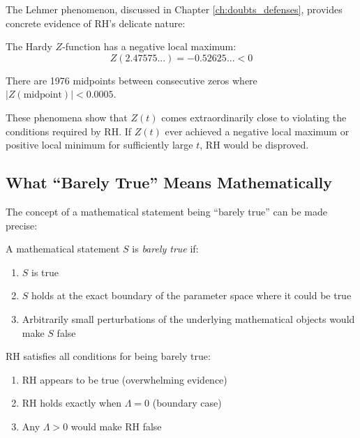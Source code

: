 The Lehmer phenomenon, discussed in Chapter \ref{ch:doubts_defenses}, provides concrete evidence of RH's delicate nature:

\begin{fact}
The Hardy $Z$-function has a negative local maximum:
\begin{equation}
Z(2.47575...) = -0.52625... < 0
\end{equation}
\end{fact}

\begin{fact} 
There are 1976 midpoints between consecutive zeros where $|Z(\text{midpoint})| < 0.0005$.
\end{fact}

\begin{interpretation}
These phenomena show that $Z(t)$ comes extraordinarily close to violating the conditions required by RH. If $Z(t)$ ever achieved a negative local maximum or positive local minimum for sufficiently large $t$, RH would be disproved.
\end{interpretation}

\subsection{What ``Barely True'' Means Mathematically}
\label{subsec:barely_true_meaning}

The concept of a mathematical statement being ``barely true'' can be made precise:

\begin{definition}
A mathematical statement $S$ is \emph{barely true} if:
\begin{enumerate}
\item $S$ is true
\item $S$ holds at the exact boundary of the parameter space where it could be true
\item Arbitrarily small perturbations of the underlying mathematical objects would make $S$ false
\end{enumerate}
\end{definition}

\begin{example}
RH satisfies all conditions for being barely true:
\begin{enumerate}
\item RH appears to be true (overwhelming evidence)
\item RH holds exactly when $\Lambda = 0$ (boundary case)
\item Any $\Lambda > 0$ would make RH false
\end{enumerate}
\end{example}

